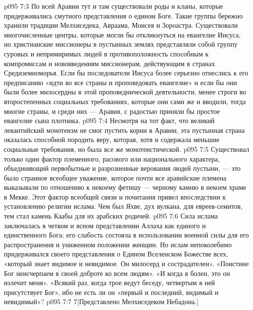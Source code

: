 \vs p095 7:3 По всей Аравии тут и там существовали роды и кланы, которые придерживались смутного представления о едином Боге. Такие группы бережно хранили традиции Мелхиседека, Авраама, Моисея и Зороастра. Существовали многочисленные центры, которые могли бы откликнуться на евангелие Иисуса, но христианские миссионеры в пустынных землях представляли собой группу суровых и непримиримых людей в противоположность способным к компромиссам и нововведениям миссионерам, действующим в странах Средиземноморья. Если бы последователи Иисуса более серьезно отнеслись к его предписанию «идти во все страны и проповедовать евангелие» и если бы они были более милосердны в этой проповеднической деятельности, менее строги во второстепенных социальных требованиях, которые они сами же и вводили, тогда многие страны, и среди них --- Аравия, с радостью приняли бы простое евангелие сына плотника.
\vs p095 7:4 Несмотря на тот факт, что великий левантийский монотеизм не смог пустить корни в Аравии, эта пустынная страна оказалась способной породить веру, которая, хотя и содержала меньшие социальные требования, но была все же монотеистической.
\vs p095 7:5 Существовал только один фактор племенного, расового или национального характера, объединяющий первобытные и разрозненные верования людей пустыни, --- это было странное всеобщее уважение, которое почти все аравийские племена выказывали по отношению к некоему фетишу --- черному камню в некоем храме в Мекке. Этот фактор всеобщей связи и почитания привел впоследствии к установлению религии ислама. Чем был Яхве, дух вулкана, для евреев\hyp{}семитов, тем стал камень Каабы для их арабских родичей.
\vs p095 7:6 Сила ислама заключалась в четком и ясном представлении Аллаха как единого и единственного Бога; его слабость состояла в использовании военной силы для его распространения и униженном положении женщин. Но ислам непоколебимо придерживался своего представления о Едином Вселенском Божестве всех, «который знает видимое и невидимое. Он милосерд и сострадателен». «Поистине Бог неисчерпаем в своей доброте ко всем людям». «И когда я болен, это он излечит меня». «Всякий раз, когда трое ведут беседу, четвертым в ней присутствует Бог», ибо не есть ли он «первый и последний, видимый и невидимый»?
\vsetoff
\vs p095 7:7 7[Представлено Мелхиседеком Небадона.]
